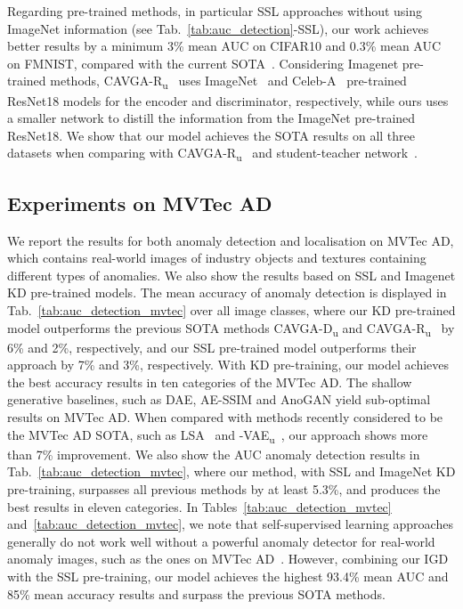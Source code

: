 \documentclass[final]{cvpr}
\begin{document}
Regarding pre-trained methods, in particular SSL approaches without using ImageNet information (see Tab.~\ref{tab:auc_detection}-SSL), our work achieves better results by a minimum 3\% mean AUC on CIFAR10 and 0.3\% mean AUC on FMNIST, compared with the current SOTA~\cite{bergman2020classification}.
Considering Imagenet pre-trained methods, CAVGA-R\textsubscript{u}~\cite{venkataramanan2019attention} uses ImageNet~\cite{imagenet} and Celeb-A~\cite{liu2018large} pre-trained ResNet18 models for the encoder and discriminator, respectively, while ours uses a smaller network to distill the information from the ImageNet pre-trained ResNet18. We show that our model achieves the SOTA results on all three datasets when comparing with CAVGA-R\textsubscript{u}~\cite{venkataramanan2019attention} and student-teacher network~\cite{bergmann2020uninformed}. 








\subsection{Experiments on MVTec AD}



We report the results for both anomaly detection and localisation on MVTec AD, which contains real-world images of industry objects and textures containing different types of anomalies. We also show the results based on SSL and Imagenet KD pre-trained models. 
The mean accuracy of anomaly detection is displayed in Tab.~\ref{tab:auc_detection_mvtec} over all image classes, where our KD pre-trained model outperforms the previous SOTA methods CAVGA-D\textsubscript{u} and CAVGA-R\textsubscript{u}~\cite{venkataramanan2019attention} by 6\% and 2\%, respectively, and our SSL pre-trained model outperforms their approach by 7\% and 3\%, respectively. 
With KD pre-training, our model achieves the best accuracy results in ten categories of the MVTec AD. The shallow generative baselines, such as DAE, AE-SSIM and AnoGAN yield sub-optimal results on MVTec AD. When compared with methods recently considered to be the MVTec AD SOTA, such as LSA~\cite{lsa} and -VAE\textsubscript{u}~\cite{lamda-vae}, our approach shows more than 7\% improvement. 
We also show the AUC anomaly detection results in Tab.~\ref{tab:auc_detection_mvtec}, where our method, with SSL and ImageNet KD pre-training, surpasses all previous methods by at least 5.3\%, and produces the best results in eleven categories.  
In Tables~\ref{tab:auc_detection_mvtec} and~\ref{tab:auc_detection_mvtec}, we note that
self-supervised learning approaches generally do not work well without a powerful anomaly detector for real-world anomaly images, such as the ones on MVTec AD~\cite{bergman2020classification,golan2018deep}.
However, combining our IGD with the SSL pre-training, our model achieves the highest 93.4\% mean AUC and 85\% mean accuracy results and surpass the previous SOTA methods. 
\end{document}
